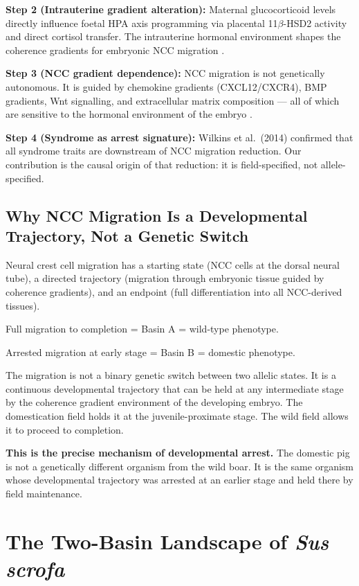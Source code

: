 \documentclass[11pt, a4paper]{article}
\begin{document}
\textbf{Step 2 (Intrauterine gradient alteration):}
Maternal glucocorticoid levels directly influence foetal
HPA axis programming via placental 11$\beta$-HSD2
activity and direct cortisol transfer. The intrauterine
hormonal environment shapes the coherence gradients
for embryonic NCC migration \cite{seckl2004}.

\textbf{Step 3 (NCC gradient dependence):} NCC migration
is not genetically autonomous. It is guided by
chemokine gradients (CXCL12/CXCR4), BMP gradients,
Wnt signalling, and extracellular matrix composition ---
all of which are sensitive to the hormonal environment
of the embryo \cite{theveneau2013}.

\textbf{Step 4 (Syndrome as arrest signature):}
Wilkins et al.\ (2014) confirmed that all syndrome
traits are downstream of NCC migration reduction.
Our contribution is the causal origin of that reduction:
it is field-specified, not allele-specified.

\subsection{Why NCC Migration Is a Developmental
Trajectory, Not a Genetic Switch}

Neural crest cell migration has a starting state
(NCC cells at the dorsal neural tube), a directed
trajectory (migration through embryonic tissue guided
by coherence gradients), and an endpoint (full
differentiation into all NCC-derived tissues).

Full migration to completion = Basin A = wild-type
phenotype.

Arrested migration at early stage = Basin B = domestic
phenotype.

The migration is not a binary genetic switch between
two allelic states. It is a continuous developmental
trajectory that can be held at any intermediate stage
by the coherence gradient environment of the developing
embryo. The domestication field holds it at the
juvenile-proximate stage. The wild field allows it to
proceed to completion.

\textbf{This is the precise mechanism of developmental
arrest.} The domestic pig is not a genetically different
organism from the wild boar. It is the same organism
whose developmental trajectory was arrested at an
earlier stage and held there by field maintenance.

\section{The Two-Basin Landscape of \textit{Sus scrofa}}
\label{sec:landscape}
\end{document}
